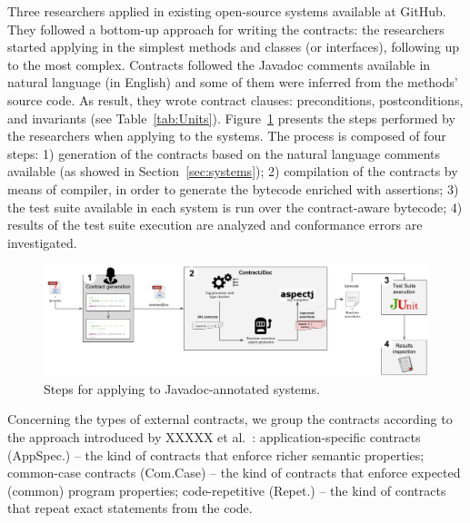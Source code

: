 Three researchers applied \contractjdoc{} in \totalSystems{} existing open-source systems
available at GitHub. They followed a bottom-up approach for
writing the \contractjdoc{} contracts: the researchers started applying
\contractjdoc{} in the simplest methods and classes (or interfaces), following
up to the most complex. Contracts followed the Javadoc comments available in
natural language (in English) and some of them were inferred from the methods'
source code.
As result, they wrote \totalClauses{} contract clauses:
\totalPre{} preconditions, \totalPost{} postconditions, and \totalInv{} invariants (see
Table~\ref{tab:Units}).
Figure~\ref{fig:applicationProcess} presents the steps performed by the researchers when applying
\contractjdoc{} to the systems. The process is composed of four steps: 1) generation of the
contracts based on the natural language comments available (as showed in
Section~\ref{sec:systems}); 2) compilation of the contracts by means of
\contractjdocCompiler{} compiler, in order to generate the bytecode enriched
with assertions; 3) the test suite available in each system is run over the
contract-aware bytecode; 4) results of the test suite execution are analyzed and
conformance errors are investigated.

\begin{figure}[h]
\centering
\includegraphics[width=1.0\textwidth]{figs/ContractJDocProcess}
\caption{Steps for applying \contractjdoc{} to Javadoc-annotated systems.}
\label{fig:applicationProcess}
\end{figure}

Concerning the types of external contracts, we group the contracts according to
the approach introduced by XXXXX et al.~\cite{typeContracts}: application-specific contracts
(AppSpec.) -- the kind of contracts that enforce richer semantic properties;
 common-case contracts (Com.Case) -- the kind of contracts that enforce
expected (common) program properties;
code-repetitive (Repet.) -- the kind of
contracts that repeat exact statements from the code.

